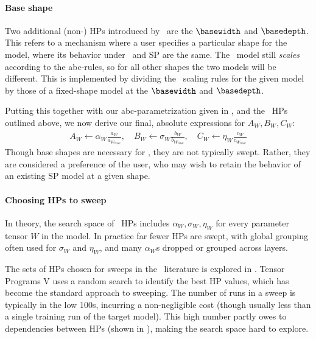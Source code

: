
\paragraph{Base shape} Two additional (non-\mutable) HPs introduced by \mup\ are the $\basewidth$ and $\basedepth$. This refers to a mechanism where a user specifies a particular shape for the model, where its behavior under \mup\ and SP are the same. The \mup\ model still \textit{scales} according to the abc-rules, so for all other shapes the two models will be different. This is implemented by dividing the \mup\ scaling rules for the given model by those of a fixed-shape model at the $\basewidth$ and $\basedepth$.

Putting this together with our abc-parametrization given in , and the \mutable\ HPs outlined above, we now derive our final, absolute expressions for $A_W,B_W,C_W$:
\begin{align} \label{eq:abc_mup_absolute}
    A_W \leftarrow \alpha_W \frac{a_W}{a_{W_\textrm{base}}},
    \quad
    B_W \leftarrow \sigma_W \frac{b_W}{b_{W_\textrm{base}}},
    \quad
    C_W \leftarrow \eta_W \frac{c_W}{c_{W_\textrm{base}}}
\end{align}
Though base shapes are necessary for \mup, they are not typically swept. Rather, they are considered a preference of the user, who may wish to retain the behavior of an existing SP model at a given shape.

\paragraph{Choosing HPs to sweep} 

In theory, the search space of \mutable\ HPs includes $\alpha_W, \sigma_W, \eta_W$ for every parameter tensor $W$ in the model. In practice far fewer HPs are swept, with global grouping often used for $\sigma_W$ and $\eta_W$, and many $\alpha_W$s dropped or grouped across layers.

The sets of HPs chosen for sweeps in the \mup\ literature is explored in . Tensor Programs V uses a random search to identify the best HP values, which has become the standard approach to sweeping. The number of runs in a sweep is typically in the low 100s, incurring a non-negligible cost (though usually less than a single training run of the target model). This high number partly owes to dependencies between HPs (shown in ), making the search space hard to explore.

